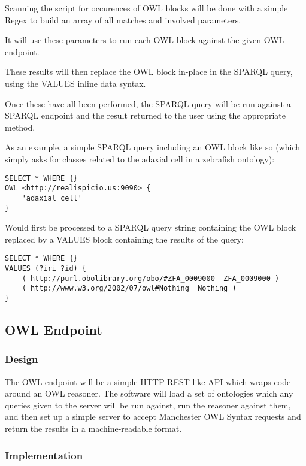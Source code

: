 \documentclass{article}
\begin{document}
Scanning the script for occurences of OWL blocks will be done with a simple
Regex to build an array of all matches and involved parameters.

It will use these parameters to run each OWL block against the given OWL 
endpoint.

These results will then replace the OWL block in-place in the SPARQL query,
using the VALUES inline data syntax.

Once these have all been performed, the SPARQL query will be run against a
SPARQL endpoint and the result returned to the user using the appropriate method.

As an example, a simple SPARQL query including an OWL block like so (which
simply asks for classes related to the adaxial cell in a zebrafish ontology):

\begin{lstlisting}
SELECT * WHERE {}
OWL <http://realispicio.us:9090> {
    'adaxial cell'
}
\end{lstlisting}

Would first be processed to a SPARQL query string containing the OWL block
replaced by a VALUES block containing the results of the query:

\begin{lstlisting}
SELECT * WHERE {} 
VALUES (?iri ?id) { 
    ( http://purl.obolibrary.org/obo/#ZFA_0009000  ZFA_0009000 ) 
    ( http://www.w3.org/2002/07/owl#Nothing  Nothing )
}
\end{lstlisting}

\subsection{OWL Endpoint}

\subsubsection{Design}

The OWL endpoint will be a simple HTTP REST-like API which wraps code around an
OWL reasoner. The software will load a set of ontologies which any queries given
to the server will be run against, run the reasoner against them, and then set
up a simple server to accept Manchester OWL Syntax requests and return the
results in a machine-readable format.

\subsubsection{Implementation}
\end{document}
